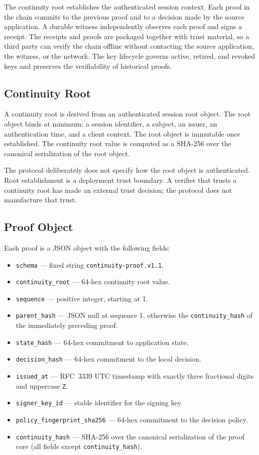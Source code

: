 \documentclass[11pt,a4paper]{article}
\begin{document}
The continuity root establishes the authenticated session context. Each proof in the chain commits to the previous proof and to a decision made by the source application. A durable witness independently observes each proof and signs a receipt. The receipts and proofs are packaged together with trust material, so a third party can verify the chain offline without contacting the source application, the witness, or the network. The key lifecycle governs active, retired, and revoked keys and preserves the verifiability of historical proofs.

\subsection{Continuity Root}

A continuity root is derived from an authenticated session root object. The root object binds at minimum: a session identifier, a subject, an issuer, an authentication time, and a client context. The root object is immutable once established. The continuity root value is computed as a SHA-256 over the canonical serialization of the root object.

The protocol deliberately does not specify how the root object is authenticated. Root establishment is a deployment trust boundary. A verifier that trusts a continuity root has made an external trust decision; the protocol does not manufacture that trust.

\subsection{Proof Object}

Each proof is a JSON object with the following fields:

\begin{itemize}
\item \texttt{schema} --- fixed string \texttt{continuity-proof.v1.1}.
\item \texttt{continuity\_root} --- 64-hex continuity root value.
\item \texttt{sequence} --- positive integer, starting at 1.
\item \texttt{parent\_hash} --- JSON null at sequence 1, otherwise the \texttt{continuity\_hash} of the immediately preceding proof.
\item \texttt{state\_hash} --- 64-hex commitment to application state.
\item \texttt{decision\_hash} --- 64-hex commitment to the local decision.
\item \texttt{issued\_at} --- RFC~3339 UTC timestamp with exactly three fractional digits and uppercase \texttt{Z}.
\item \texttt{signer\_key\_id} --- stable identifier for the signing key.
\item \texttt{policy\_fingerprint\_sha256} --- 64-hex commitment to the decision policy.
\item \texttt{continuity\_hash} --- SHA-256 over the canonical serialization of the proof core (all fields except \texttt{continuity\_hash}).
\end{itemize}
\end{document}
